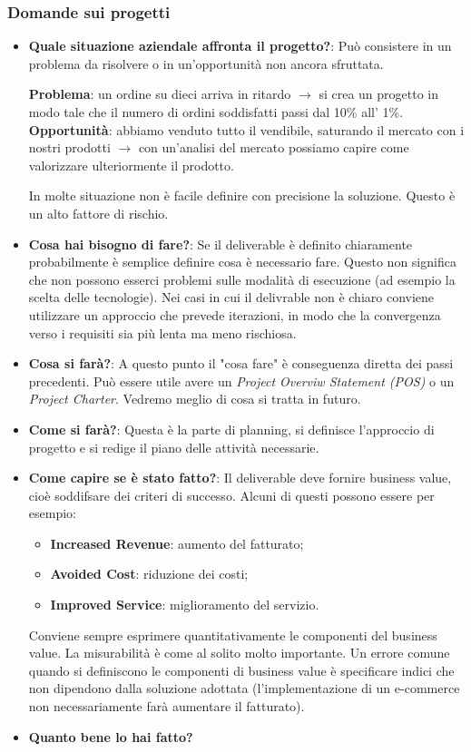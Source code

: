 \subsubsection{Domande sui progetti}
\begin{itemize}
	\item \textbf{Quale situazione aziendale affronta il progetto?}: Può consistere in un problema da risolvere o in un'opportunità non ancora sfruttata.
	\begin{info}[Esempio]
		\textbf{Problema}: un ordine su dieci arriva in ritardo $\xrightarrow{}$ si crea un progetto in modo tale che il numero di ordini soddisfatti passi dal 10\% all' 1\%.\newline
		\textbf{Opportunità}: abbiamo venduto tutto il vendibile, saturando il mercato con i nostri prodotti $\xrightarrow{}$ con un'analisi del mercato possiamo capire come valorizzare ulteriormente il prodotto.
	\end{info}
	In molte situazione non è facile definire con precisione la soluzione. Questo è un alto fattore di rischio.
	\item \textbf{Cosa hai bisogno di fare?}: Se il deliverable è definito chiaramente probabilmente è semplice definire cosa è necessario fare. Questo non significa che non possono esserci problemi sulle modalità di esecuzione (ad esempio la scelta delle tecnologie). Nei casi in cui il delivrable non è chiaro conviene utilizzare un approccio che prevede iterazioni, in modo che la convergenza verso i requisiti sia più lenta ma meno rischiosa.
	\item \textbf{Cosa si farà?}: A questo punto il "cosa fare" è conseguenza diretta dei passi precedenti. Può essere utile avere un \textit{Project Overviw Statement (POS)} o un \textit{Project Charter}. Vedremo meglio di cosa si tratta in futuro.
	\item \textbf{Come si farà?}: Questa è la parte di planning, si definisce l'approccio di progetto e si redige il piano delle attività necessarie.
	\item \textbf{Come capire se è stato fatto?}: Il deliverable deve fornire business value, cioè soddifsare dei criteri di successo. Alcuni di questi possono essere per esempio:
	\begin{itemize}
		\item \textbf{Increased Revenue}: aumento del fatturato;
		\item \textbf{Avoided Cost}: riduzione dei costi;
		\item \textbf{Improved Service}: miglioramento del servizio.
	\end{itemize}
	Conviene sempre esprimere quantitativamente le componenti del business value. La misurabilità è come al solito molto importante. Un errore comune quando si definiscono le componenti di business value è specificare indici che non dipendono dalla soluzione adottata (l'implementazione di un e-commerce non necessariamente farà aumentare il fatturato).
	\item \textbf{Quanto bene lo hai fatto?}
\end{itemize}
